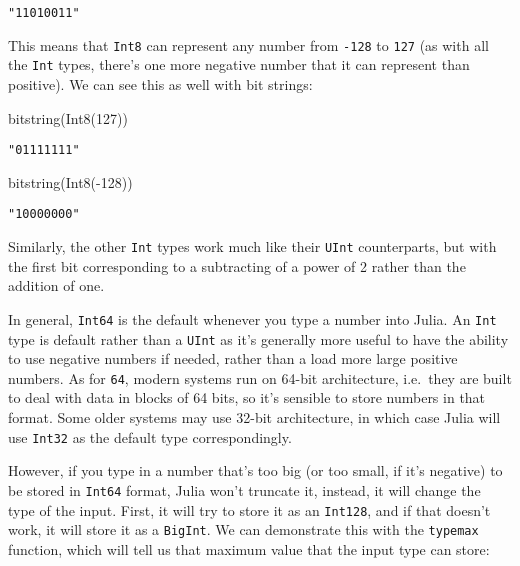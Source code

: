 \documentclass[
  letterpaper,
  DIV=11,
  numbers=noendperiod]{scrreprt}
\newenvironment{Shaded}{\begin{snugshade}}{\end{snugshade}}
\newcommand{\FloatTok}[1]{\textcolor[rgb]{0.68,0.00,0.00}{#1}}
\newcommand{\FunctionTok}[1]{\textcolor[rgb]{0.28,0.35,0.67}{#1}}
\newcommand{\NormalTok}[1]{\textcolor[rgb]{0.00,0.23,0.31}{#1}}
\newcommand{\OperatorTok}[1]{\textcolor[rgb]{0.37,0.37,0.37}{#1}}
\begin{document}
\begin{verbatim}
"11010011"
\end{verbatim}

This means that \texttt{Int8} can represent any number from
\texttt{-128} to \texttt{127} (as with all the \texttt{Int} types,
there's one more negative number that it can represent than positive).
We can see this as well with bit strings:

\begin{Shaded}
\begin{Highlighting}[]
\FunctionTok{bitstring}\NormalTok{(}\FunctionTok{Int8}\NormalTok{(}\FloatTok{127}\NormalTok{))}
\end{Highlighting}
\end{Shaded}

\begin{verbatim}
"01111111"
\end{verbatim}

\begin{Shaded}
\begin{Highlighting}[]
\FunctionTok{bitstring}\NormalTok{(}\FunctionTok{Int8}\NormalTok{(}\OperatorTok{{-}}\FloatTok{128}\NormalTok{))}
\end{Highlighting}
\end{Shaded}

\begin{verbatim}
"10000000"
\end{verbatim}

Similarly, the other \texttt{Int} types work much like their
\texttt{UInt} counterparts, but with the first bit corresponding to a
subtracting of a power of 2 rather than the addition of one.

In general, \texttt{Int64} is the default whenever you type a number
into Julia. An \texttt{Int} type is default rather than a \texttt{UInt}
as it's generally more useful to have the ability to use negative
numbers if needed, rather than a load more large positive numbers. As
for \texttt{64}, modern systems run on 64-bit architecture, i.e.~they
are built to deal with data in blocks of 64 bits, so it's sensible to
store numbers in that format. Some older systems may use 32-bit
architecture, in which case Julia will use \texttt{Int32} as the default
type correspondingly.

However, if you type in a number that's too big (or too small, if it's
negative) to be stored in \texttt{Int64} format, Julia won't truncate
it, instead, it will change the type of the input. First, it will try to
store it as an \texttt{Int128}, and if that doesn't work, it will store
it as a \texttt{BigInt}. We can demonstrate this with the
\texttt{typemax} function, which will tell us that maximum value that
the input type can store:
\end{document}
